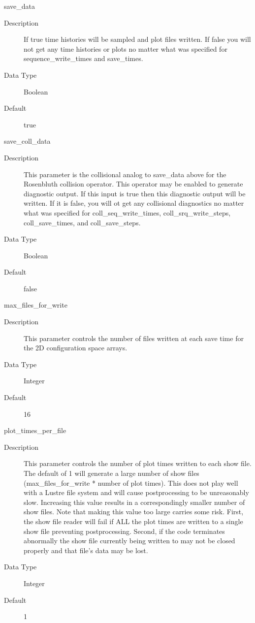 \documentclass[11pt]{amsart}
\begin{document}
save\_data
\begin{description}
\item [Description] If true time histories will be sampled and plot files
written.  If false you will not get any time histories or plots no matter
what was specified for sequence\_write\_times and save\_times.
\item [Data Type] Boolean
\item [Default] true
\end{description}

save\_coll\_data
\begin{description}
\item [Description] This parameter is the collisional analog to save\_data above
for the Rosenbluth collision operator.  This operator may be enabled to generate
diagnostic output.  If this input is true then this diagnostic output will be
written.  If it is false, you will ot get any collisional diagnostics no matter
what was specified for coll\_seq\_write\_times, coll\_srq\_write\_steps,
coll\_save\_times, and coll\_save\_steps.
\item [Data Type] Boolean
\item [Default] false
\end{description}

max\_files\_for\_write
\begin{description}
\item [Description] This parameter controls the number of files written at each
save time for the 2D configuration space arrays.
\item [Data Type] Integer
\item [Default] 16
\end{description}

plot\_times\_per\_file
\begin{description}
\item [Description] This parameter controls the number of plot times written
to each show file.  The default of 1 will generate a large number of show files
(max\_files\_for\_write * number of plot times).  This does not play well with
a Lustre file system and will cause postprocessing to be unreasonably slow.
Increasing this value results in a correspondingly smaller number of show
files.  Note that making this value too large carries some risk.  First, the
show file reader will fail if ALL the plot times are written to a single show
file preventing postprocessing.  Second, if the code terminates abnormally the
show file currently being written to may not be closed properly and that file's
data may be lost.
\item [Data Type] Integer
\item [Default] 1
\end{description}
\end{document}
